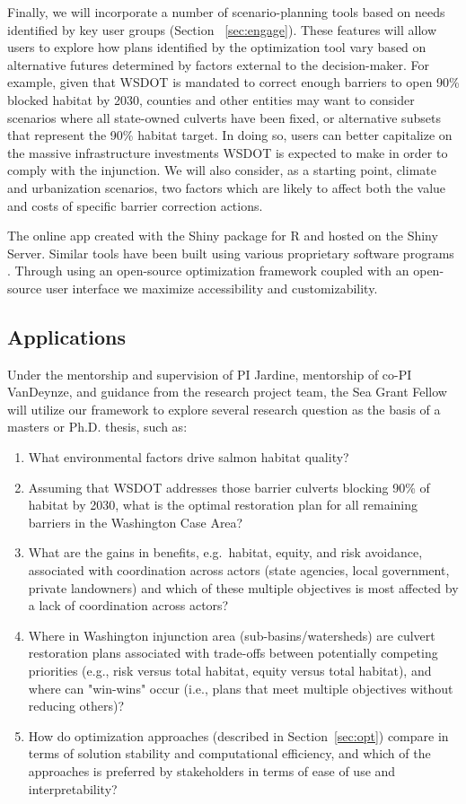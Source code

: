 \documentclass[12pt]{elsarticle}
\begin{document}
Finally, we will incorporate a number of scenario-planning tools based on needs identified by key user groups (Section ~\ref{sec:engage}). These features will allow users to explore how plans identified by the optimization tool vary based on alternative futures determined by factors external to the decision-maker. For example, given that WSDOT is mandated to correct enough barriers to open 90\% blocked habitat by 2030, counties and other entities may want to consider scenarios where all state-owned culverts have been fixed, or alternative subsets that represent the 90\% habitat target. In doing so, users can better capitalize on the massive infrastructure investments WSDOT is expected to make in order to comply with the injunction. We will also consider, as a starting point, climate and urbanization scenarios, two factors which are likely to affect both the value and costs of specific barrier correction actions.
  
The online app created with the Shiny package for R and hosted on the Shiny Server. Similar tools have been built using various proprietary software programs \citep{ohanley_optipass_2015, moody_pet_2017, mcmanamay_commonalities_2019}. Through using an open-source optimization framework coupled with an open-source user interface we maximize accessibility and customizability. 

\subsection*{Applications}

Under the mentorship and supervision of PI Jardine, mentorship of co-PI VanDeynze, and guidance from the research project team, the Sea Grant Fellow will utilize our framework to explore several research question as the basis of a masters or Ph.D. thesis, such as: 

\begin{enumerate}
\item What environmental factors drive salmon habitat quality?
\item Assuming that WSDOT addresses those barrier culverts blocking 90\% of habitat by 2030, what is the optimal restoration plan for all remaining barriers in the Washington Case Area?
\item What are the gains in benefits, e.g.\ habitat, equity, and risk avoidance, associated with coordination across actors (state agencies, local government, private landowners) and which of these multiple objectives is most affected by a lack of coordination across actors? 
\item Where in Washington injunction area (sub-basins/watersheds) are culvert restoration plans associated with trade-offs between potentially competing priorities (e.g., risk versus total habitat, equity versus total habitat), and where can "win-wins" occur (i.e., plans that meet multiple objectives without reducing others)? 
\item How do optimization approaches (described in Section~\ref{sec:opt}) compare in terms of solution stability and computational efficiency, and which of the approaches is preferred by stakeholders in terms of ease of use and interpretability?
\end{enumerate}
\end{document}
